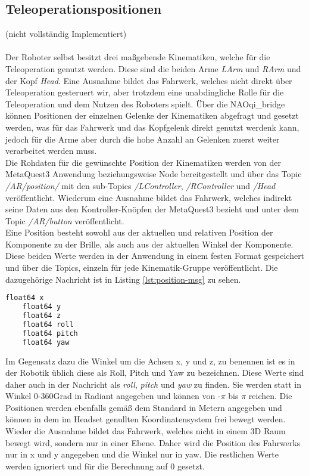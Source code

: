 \subsection{Teleoperationspositionen}
(nicht vollständig Implementiert)\\\\
Der Roboter selbst besitzt drei maßgebende Kinematiken, welche für die Teleoperation genutzt werden. Diese sind die beiden Arme  \textit{LArm} und \textit{RArm} und der Kopf \textit{Head}. Eine Ausnahme bildet das Fahrwerk, welches nicht direkt über Teleoperation gesteruert wir, aber trotzdem eine unabdingliche Rolle für die Teleoperation und dem Nutzen des Roboters spielt. Über die NAOqi\_bridge können Positionen der einzelnen Gelenke der Kinematiken abgefragt und gesetzt werden, was für das Fahrwerk und das Kopfgelenk direkt genutzt werdenk kann, jedoch für die Arme aber durch die hohe Anzahl an Gelenken zuerst weiter verarbeitet werden muss.\\
Die Rohdaten für die gewünschte Position der Kinematiken werden von der MetaQuest3 Anwendung beziehungsweise Node bereitgestellt und über das Topic \textit{/AR/position/} mit den sub-Topics \textit{/LController}, \textit{/RController} und \textit{/Head} veröffentlicht. Wiederum eine Ausnahme bildet das Fahrwerk, welches indirekt seine Daten aus den Kontroller-Knöpfen der MetaQuest3 bezieht und unter dem Topic \textit{/AR/button} veröffentlicht.\\
Eine Position besteht sowohl aus der aktuellen und relativen Position der Komponente zu der Brille, als auch aus der aktuellen Winkel der Komponente. Diese beiden Werte werden in der Anwendung in einem festen Format gespeichert und über die Topics, einzeln für jede Kinematik-Gruppe veröffentlicht. Die dazugehörige Nachricht ist in Listing \autoref{lst:position-msg} zu sehen.\\
\begin{lstlisting}[language=Python, caption=Positions Topic, label=lst:position-msg]
    float64 x
    float64 y
    float64 z
    float64 roll
    float64 pitch
    float64 yaw
\end{lstlisting}
Im Gegensatz dazu die Winkel um die Achsen x, y und z, zu benennen ist es in der Robotik üblich diese als Roll, Pitch und Yaw zu bezeichnen. Diese Werte sind daher auch in der Nachricht als \textit{roll}, \textit{pitch} und \textit{yaw} zu finden. Sie werden statt in Winkel 0-360Grad in Radiant angegeben und können von -$\pi$ bis $\pi$ reichen. Die Positionen werden ebenfalls gemäß dem Standard in Metern angegeben und können in dem im Headset genullten Koordinatensystem frei bewegt werden.\\
Wieder die Ausnahme bildet das Fahrwerk, welches nicht in einem 3D Raum bewegt wird, sondern nur in einer Ebene. Daher wird die Position des Fahrwerks nur in x und y angegeben und die Winkel nur in yaw. Die restlichen Werte werden ignoriert und für die Berechnung auf 0 gesetzt.\\

